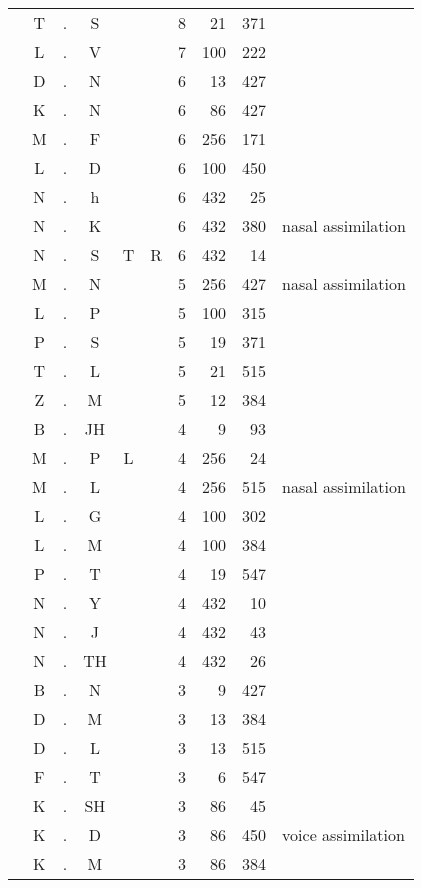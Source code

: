 \begin{center}
\begin{longtable}{c@{ } c@{ } c@{ } c@{ } c@{ } c@{ } r r r l }
  & T  & . & S  &   &   & 8 & 21 & 371 &  \\ 
  & L  & . & V  &   &   & 7 & 100 & 222 &  \\ 
  & D  & . & N  &   &   & 6 & 13 & 427 &  \\ 
  & K  & . & N  &   &   & 6 & 86 & 427 &  \\ 
  & M  & . & F  &   &   & 6 & 256 & 171 &  \\ 
  & L  & . & D  &   &   & 6 & 100 & 450 &  \\ 
  & N  & . & h  &   &   & 6 & 432 & 25 & \\
  & N  & . & K  &   &   & 6 & 432 & 380 & nasal assimilation \\
  & N  & . & S  & T & R & 6 & 432 & 14 &  \\ 
  & M  & . & N  &   &   & 5 & 256 & 427 & nasal assimilation \\
  & L  & . & P  &   &   & 5 & 100 & 315 &  \\ 
  & P  & . & S  &   &   & 5 & 19 & 371 &  \\ 
  & T  & . & L  &   &   & 5 & 21 & 515 &  \\ 
  & Z  & . & M  &   &   & 5 & 12 & 384 &  \\ 
  & B  & . & JH &   &   & 4 & 9 & 93 &  \\ 
  & M  & . & P  & L &   & 4 & 256 & 24 &  \\ 
  & M  & . & L  &   &   & 4 & 256 & 515 & nasal assimilation \\
  & L  & . & G  &   &   & 4 & 100 & 302 &  \\ 
  & L  & . & M  &   &   & 4 & 100 & 384 &  \\ 
  & P  & . & T  &   &   & 4 & 19 & 547 &  \\ 
  & N  & . & Y  &   &   & 4 & 432 & 10 &  \\ 
  & N  & . & J  &   &   & 4 & 432 & 43 &  \\ 
  & N  & . & TH &   &   & 4 & 432 & 26 &  \\ 
  & B  & . & N  &   &   & 3 & 9 & 427 &  \\ 
  & D  & . & M  &   &   & 3 & 13 & 384 &  \\ 
  & D  & . & L  &   &   & 3 & 13 & 515 &  \\ 
  & F  & . & T  &   &   & 3 & 6 & 547 &  \\ 
  & K  & . & SH &   &   & 3 & 86 & 45 &  \\ 
  & K  & . & D  &   &   & 3 & 86 & 450 & voice assimilation \\
  & K  & . & M  &   &   & 3 & 86 & 384 &  \\ 

\end{longtable}
\end{center}
